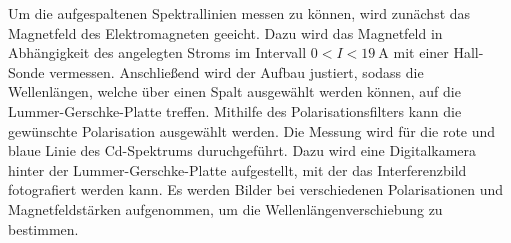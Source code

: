 Um die aufgespaltenen Spektrallinien messen zu können, wird zunächst das Magnetfeld des
Elektromagneten geeicht. Dazu wird das Magnetfeld in Abhängigkeit des angelegten Stroms
im Intervall $0<I<\SI{19}{\A}$ mit einer Hall-Sonde vermessen. Anschließend wird der
Aufbau justiert, sodass die Wellenlängen, welche über einen Spalt ausgewählt werden können, auf
die Lummer-Gerschke-Platte treffen. Mithilfe des Polarisationsfilters kann die
gewünschte Polarisation ausgewählt werden.
Die Messung wird für die rote und blaue Linie des Cd-Spektrums duruchgeführt. Dazu wird
eine Digitalkamera hinter der Lummer-Gerschke-Platte aufgestellt, mit der das Interferenzbild
fotografiert werden kann. Es werden Bilder bei verschiedenen Polarisationen und
Magnetfeldstärken aufgenommen, um die Wellenlängenverschiebung zu bestimmen.
